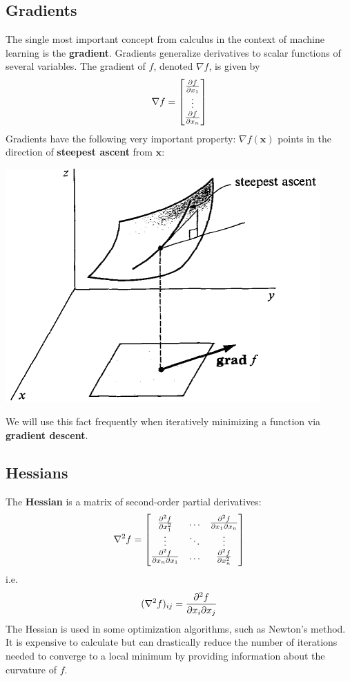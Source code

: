 \documentclass{article}
\renewcommand{\vec}[1]{\mathbf{#1}}
\newcommand{\matlit}[1]{\begin{bmatrix}#1\end{bmatrix}}
\newcommand{\term}[1]{\textbf{#1}}
\begin{document}
\subsection{Gradients}
The single most important concept from calculus in the context of machine learning is the \term{gradient}. Gradients generalize derivatives to scalar functions of several variables. The gradient of $f$, denoted $\nabla f$, is given by
\[\nabla f = \matlit{\pdv{f}{x_1} \\ \vdots \\ \pdv{f}{x_n}}\]
Gradients have the following very important property: $\nabla f(\vec{x})$ points in the direction of \term{steepest ascent} from $\vec{x}$:
\begin{center}
\includegraphics[width=0.9\linewidth]{gradient.png}
\end{center}
We will use this fact frequently when iteratively minimizing a function via \term{gradient descent}.

\subsection{Hessians}
The \term{Hessian} is a matrix of second-order partial derivatives:
\[\nabla^2 f = \matlit{
	\pdv[2]{f}{x_1} & \hdots & \pdv{f}{x_1}{x_n} \\
	\vdots & \ddots & \vdots \\
	\pdv{f}{x_n}{x_1} & \hdots & \pdv[2]{f}{x_n}
}\]
i.e.
\[(\nabla^2 f)_{ij} = \pdv{f}{x_i}{x_j}\]
The Hessian is used in some optimization algorithms, such as Newton's method. It is expensive to calculate but can drastically reduce the number of iterations needed to converge to a local minimum by providing information about the curvature of $f$.
\end{document}
